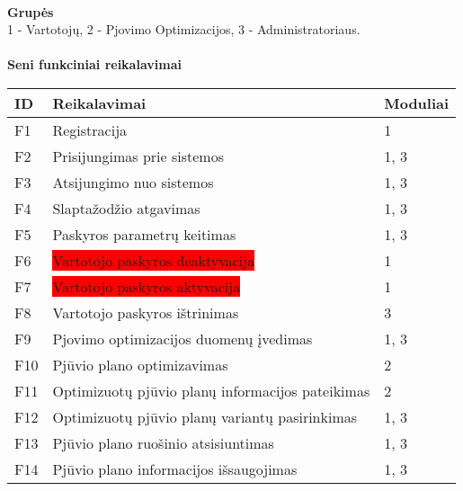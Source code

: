 \documentclass[a4paper,12pt]{article}
\begin{document}
\\
\textbf{Grupės} \\
1 - Vartotojų, 2 - Pjovimo Optimizacijos, 3 - Administratoriaus.\\\\
\textbf{Seni funkciniai reikalavimai}\\

\begin{frame}
\centering
\hspace{-2.5cm}
\label{my-label}
\begin{tabular}{|l|l|l|}
\hline
\textbf{ID}	& \textbf{Reikalavimai}						& \textbf{Moduliai}  \\ \hline

F1	& Registracija										& 1	    	\\ \hline

F2	& Prisijungimas prie sistemos						& 1, 3	\\ \hline

F3	& Atsijungimo nuo sistemos							& 1, 3	\\ \hline

F4	& Slaptažodžio atgavimas								& 1, 3	\\ \hline

F5	& Paskyros parametrų keitimas 	  					& 1, 3	\\ \hline 

F6	& \colorbox{red}{Vartotojo paskyros deaktyvacija}	& 1		\\ \hline

F7	& \colorbox{red}{Vartotojo paskyros aktyvacija}		& 1		\\ \hline

F8	& Vartotojo paskyros ištrinimas						& 3		\\ \hline

F9	& Pjovimo optimizacijos duomenų įvedimas				& 1, 3	\\ \hline

F10	& Pjūvio plano optimizavimas           	   			& 2		\\ \hline

F11	& Optimizuotų pjūvio planų informacijos pateikimas	& 2     	\\ \hline

F12	& Optimizuotų pjūvio planų variantų pasirinkimas		& 1, 3	\\ \hline

F13 & Pjūvio plano ruošinio atsisiuntimas				& 1, 3	\\ \hline

F14 	& Pjūvio plano informacijos išsaugojimas				& 1, 3	\\ \hline


\end{tabular}
\end{frame}
\end{document}
